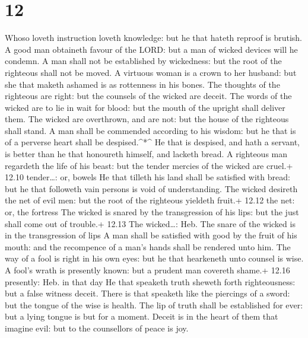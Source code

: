 \hypertarget{section-11}{%
\section{12}\label{section-11}}

 Whoso loveth instruction loveth knowledge: but he that
hateth reproof is brutish.  A good man obtaineth favour of
the LORD: but a man of wicked devices will he condemn.  A
man shall not be established by wickedness: but the root of the
righteous shall not be moved.  A virtuous woman is a crown
to her husband: but she that maketh ashamed is as rottenness in his
bones.  The thoughts of the righteous are right: but the
counsels of the wicked are deceit.  The words of the wicked
are to lie in wait for blood: but the mouth of the upright shall deliver
them.  The wicked are overthrown, and are not: but the house
of the righteous shall stand.  A man shall be commended
according to his wisdom: but he that is of a perverse heart shall be
despised.\^{}*\^{}  He that is despised, and hath a servant,
is better than he that honoureth himself, and lacketh bread.
 A righteous man regardeth the life of his beast: but the
tender mercies of the wicked are cruel.+ 12.10 tender\ldots: or, bowels
 He that tilleth his land shall be satisfied with bread:
but he that followeth vain persons is void of understanding.
 The wicked desireth the net of evil men: but the root of
the righteous yieldeth fruit.+ 12.12 the net: or, the fortress
 The wicked is snared by the transgression of his lips: but
the just shall come out of trouble.+ 12.13 The wicked\ldots: Heb. The
snare of the wicked is in the transgression of lips  A man
shall be satisfied with good by the fruit of his mouth: and the
recompence of a man's hands shall be rendered unto him. 
The way of a fool is right in his own eyes: but he that hearkeneth unto
counsel is wise.  A fool's wrath is presently known: but a
prudent man covereth shame.+ 12.16 presently: Heb. in that day
 He that speaketh truth sheweth forth righteousness: but a
false witness deceit.  There is that speaketh like the
piercings of a sword: but the tongue of the wise is health.
 The lip of truth shall be established for ever: but a
lying tongue is but for a moment.  Deceit is in the heart
of them that imagine evil: but to the counsellors of peace is joy.
